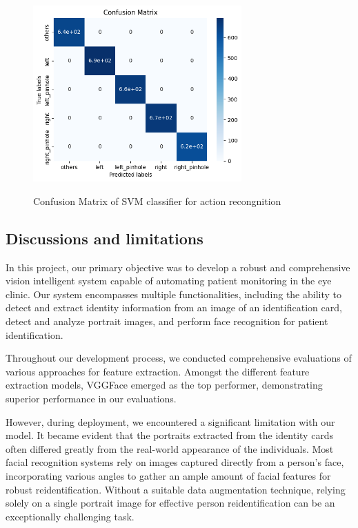\documentclass{article}
\begin{document}
\begin{figure}[tbh]
    \begin{center}
        \includegraphics[width=8cm]{confusion_matrix_occuluder.png}\
        \caption{Confusion Matrix of SVM classifier for action recongnition\label{confusion-matrix}} 
    \end{center}
\end{figure}

\subsection{Discussions and limitations}
In this project, our primary objective was to develop a robust and comprehensive vision intelligent system capable of automating patient monitoring in the eye clinic. Our system encompasses multiple functionalities, including the ability to detect and extract identity information from an image of an identification card, detect and analyze portrait images, and perform face recognition for patient identification.

Throughout our development process, we conducted comprehensive evaluations of various approaches for feature extraction. Amongst the different feature extraction models, VGGFace emerged as the top performer, demonstrating superior performance in our evaluations.

However, during deployment, we encountered a significant limitation with our model. It became evident that the portraits extracted from the identity cards often differed greatly from the real-world appearance of the individuals. Most facial recognition systems rely on images captured directly from a person's face, incorporating various angles to gather an ample amount of facial features for robust reidentification. Without a suitable data augmentation technique, relying solely on a single portrait image for effective person reidentification can be an exceptionally challenging task.
\end{document}
